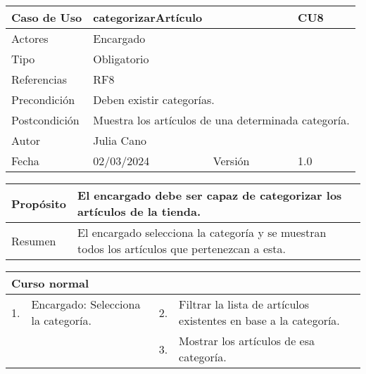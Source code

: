 \begin{table}[H]
	\centering
	\begin{tabular}{| m{} | m{} | m{} | m{}|}
		\hline
		\rowcolor{grayshade} Caso de Uso & \multicolumn{2}{|m{0.43\textwidth}|}{categorizarArtículo} &  CU8\\ 
		\hline
		Actores & \multicolumn{3}{l|}{Encargado} \\ 
		\hline
		Tipo & \multicolumn{3}{l|}{Obligatorio} \\ 
		\hline
		Referencias & \multicolumn{3}{l|}{RF8} \\ 
		\hline
		Precondición & \multicolumn{3}{m{0.67\textwidth}|}{Deben existir categorías.} \\ 
		\hline
		Postcondición & \multicolumn{3}{m{0.67\textwidth}|}{Muestra los artículos de una determinada categoría.} \\ 
		\hline
		Autor & \multicolumn{3}{l|}{Julia Cano} \\ 
		\hline
		Fecha & 02/03/2024 & Versión & 1.0 \\
		\hline
	\end{tabular}
\end{table}

\begin{table}[H]
	\centering
	\begin{tabular}{| m{} | m{} | m{} | m{} |}
		\hline
		Propósito & \multicolumn{3}{m{0.67\textwidth}|}{El encargado debe ser capaz de categorizar los artículos de la tienda.}  \\ 
		\hline
		Resumen & \multicolumn{3}{m{0.67\textwidth}|}{El encargado selecciona la categoría y se muestran todos los artículos que pertenezcan a esta.} \\ 
		\hline
	\end{tabular}
\end{table}


\begin{table}[H]
	\centering
	\begin{tabular}{| m{} | m{} | m{} | m{} |}
		\hline
		\multicolumn{4}{|m{0.9\textwidth}|}{Curso normal}     \\ 
		\hline
		1. & Encargado: Selecciona la categoría. & 2. &  Filtrar la lista de artículos existentes en base a la categoría.  \\ 
		\hline
		&  & 3. & Mostrar los artículos de esa categoría.  \\ 
		\hline
	\end{tabular}
\end{table}

